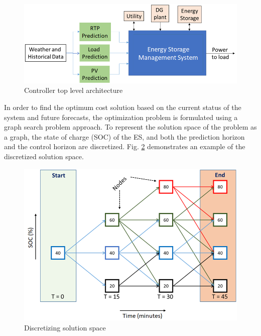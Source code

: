 \begin{figure}[!ht]
    \centering
    \includegraphics[width = \linewidth]{figs/EMS_FIG.png}
    \caption{Controller top level architecture}
    \label{fig:F1_CA}
\end{figure}

In order to find the optimum cost solution based on the current status of the system and future forecasts, the optimization problem is formulated using a graph search problem approach. To represent the solution space of the problem as a graph, the state of charge (SOC) of the ES, and both the prediction horizon and the control horizon are discretized. Fig. \ref{fig:F1_Dis} demonstrates an example of the discretized solution space.
\begin{figure}[!ht]
    \centering
    \includegraphics[width = \linewidth]{figs/F1_1_Dis.png}
    \caption{Discretizing solution space}
    \label{fig:F1_Dis}
\end{figure}
